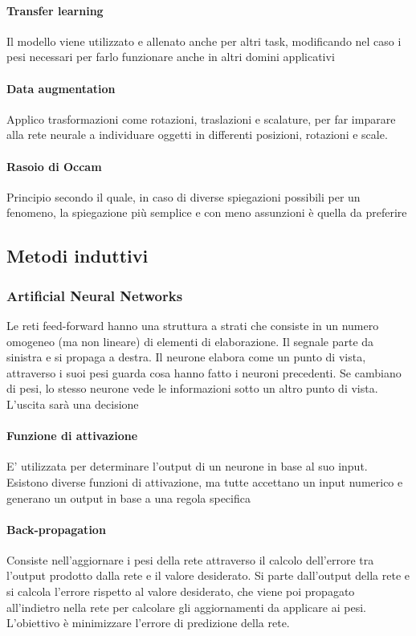 \paragraph{Transfer learning}
Il modello viene utilizzato e allenato anche per altri task, modificando nel caso i pesi necessari per farlo funzionare anche in altri domini applicativi

\paragraph{Data augmentation}
Applico trasformazioni come rotazioni, traslazioni e scalature, per far imparare alla rete neurale a individuare oggetti in differenti posizioni, rotazioni e scale.

\paragraph{Rasoio di Occam}
Principio secondo il quale, in caso di diverse spiegazioni possibili per un fenomeno, la spiegazione più semplice e con meno assunzioni è quella da preferire

\subsection{Metodi induttivi}

\subsubsection{Artificial Neural Networks}
Le reti feed-forward hanno una struttura a strati che consiste in un numero omogeneo (ma non lineare) di elementi di elaborazione. Il segnale parte da sinistra e si propaga a destra. Il neurone elabora come un punto di vista, attraverso i suoi pesi guarda cosa hanno fatto i neuroni precedenti. Se cambiano di pesi, lo stesso neurone vede le informazioni sotto un altro punto di vista. L’uscita sarà una decisione

\paragraph{Funzione di attivazione}
E' utilizzata per determinare l'output di un neurone in base al suo input. Esistono diverse funzioni di attivazione, ma tutte accettano un input numerico e generano un output in base a una regola specifica

\paragraph{Back-propagation}
Consiste nell'aggiornare i pesi della rete attraverso il calcolo dell'errore tra l'output prodotto dalla rete e il valore desiderato. Si parte dall'output della rete e si calcola l'errore rispetto al valore desiderato, che viene poi propagato all'indietro nella rete per calcolare gli aggiornamenti da applicare ai pesi. L'obiettivo è minimizzare l'errore di predizione della rete.


